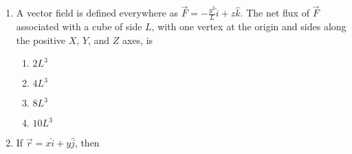 \documentclass[journal]{IEEEtran}
\begin{document}
\begin{enumerate}
\begin{enumerate}
\item $6, 1$  
$\begin{bmatrix} $4$ \\ $1$ \end{bmatrix}$ 
$\begin{bmatrix} $1$ \\ $-1$ \end{bmatrix}$
\item $2, 5$  
$\begin{bmatrix} $4$ \\ $1$ \end{bmatrix}$ 
$\begin{bmatrix} $1$ \\ $-1$ \end{bmatrix}$
\item  $6, 1$  
$\begin{bmatrix} $1$ \\ $4$ \end{bmatrix}$ 
$\begin{bmatrix} $1$ \\ $-1$ \end{bmatrix}$
\item $2, 5$  
$\begin{bmatrix} $1$ \\ $4$ \end{bmatrix}$ 
$\begin{bmatrix} $1$ \\ $-1$ \end{bmatrix}$
\end{enumerate}
\item A vector field is defined everywhere as $\vec{F} = -\frac{y^2}{L} \hat{i} + z \hat{k}$. The net flux of $\vec{F}$ associated with a cube of side $L$, with one vertex at the origin and sides along the positive $X$, $Y$, and $Z$ axes, is

\begin{enumerate}
\item $2L^3$ \quad
\item $4L^3$ \quad
\item $8L^3$ \quad
\item $10L^3$
\end{enumerate}


\item If $\vec{r} = x \hat{i} + y \hat{j}$, then


\begin{enumerate}


\end{enumerate}
\end{enumerate}
\end{document}
